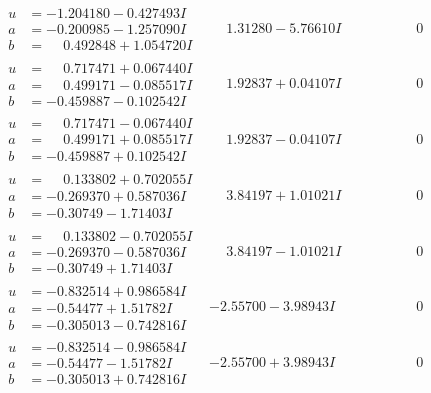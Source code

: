 \documentclass[1p]{elsarticle_modified}
\theoremstyle{definition}
\begin{document}
$$\begin{array}{c|c|c}
\begin{aligned}
u &= -1.204180 - 0.427493 I \\
a &= -0.200985 - 1.257090 I \\
b &= \phantom{-}0.492848 + 1.054720 I\end{aligned}
 & \phantom{-}1.31280 - 5.76610 I & \phantom{-0.000000 } 0 \\ \hline\begin{aligned}
u &= \phantom{-}0.717471 + 0.067440 I \\
a &= \phantom{-}0.499171 - 0.085517 I \\
b &= -0.459887 - 0.102542 I\end{aligned}
 & \phantom{-}1.92837 + 0.04107 I & \phantom{-0.000000 } 0 \\ \hline\begin{aligned}
u &= \phantom{-}0.717471 - 0.067440 I \\
a &= \phantom{-}0.499171 + 0.085517 I \\
b &= -0.459887 + 0.102542 I\end{aligned}
 & \phantom{-}1.92837 - 0.04107 I & \phantom{-0.000000 } 0 \\ \hline\begin{aligned}
u &= \phantom{-}0.133802 + 0.702055 I \\
a &= -0.269370 + 0.587036 I \\
b &= -0.30749 - 1.71403 I\end{aligned}
 & \phantom{-}3.84197 + 1.01021 I & \phantom{-0.000000 } 0 \\ \hline\begin{aligned}
u &= \phantom{-}0.133802 - 0.702055 I \\
a &= -0.269370 - 0.587036 I \\
b &= -0.30749 + 1.71403 I\end{aligned}
 & \phantom{-}3.84197 - 1.01021 I & \phantom{-0.000000 } 0 \\ \hline\begin{aligned}
u &= -0.832514 + 0.986584 I \\
a &= -0.54477 + 1.51782 I \\
b &= -0.305013 - 0.742816 I\end{aligned}
 & -2.55700 - 3.98943 I & \phantom{-0.000000 } 0 \\ \hline\begin{aligned}
u &= -0.832514 - 0.986584 I \\
a &= -0.54477 - 1.51782 I \\
b &= -0.305013 + 0.742816 I\end{aligned}
 & -2.55700 + 3.98943 I & \phantom{-0.000000 } 0 \\ \hline\begin{aligned}

\end{aligned}
\end{array}$$
\end{document}
